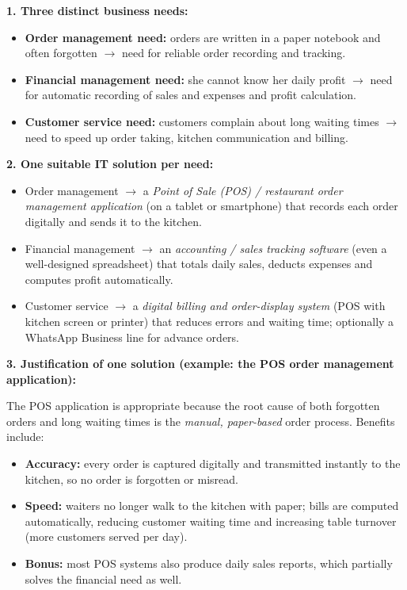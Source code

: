 \documentclass[11pt]{article}
\begin{document}
\begin{corrige}
\textbf{1. Three distinct business needs:}
\begin{itemize}
\item \textbf{Order management need:} orders are written in a paper notebook and often forgotten $\rightarrow$ need for reliable order recording and tracking.
\item \textbf{Financial management need:} she cannot know her daily profit $\rightarrow$ need for automatic recording of sales and expenses and profit calculation.
\item \textbf{Customer service need:} customers complain about long waiting times $\rightarrow$ need to speed up order taking, kitchen communication and billing.
\end{itemize}

\textbf{2. One suitable IT solution per need:}
\begin{itemize}
\item Order management $\rightarrow$ a \emph{Point of Sale (POS) / restaurant order management application} (on a tablet or smartphone) that records each order digitally and sends it to the kitchen.
\item Financial management $\rightarrow$ an \emph{accounting / sales tracking software} (even a well-designed spreadsheet) that totals daily sales, deducts expenses and computes profit automatically.
\item Customer service $\rightarrow$ a \emph{digital billing and order-display system} (POS with kitchen screen or printer) that reduces errors and waiting time; optionally a WhatsApp Business line for advance orders.
\end{itemize}

\textbf{3. Justification of one solution (example: the POS order management application):}

The POS application is appropriate because the root cause of both forgotten orders and long waiting times is the \emph{manual, paper-based} order process. Benefits include:
\begin{itemize}
\item \textbf{Accuracy:} every order is captured digitally and transmitted instantly to the kitchen, so no order is forgotten or misread.
\item \textbf{Speed:} waiters no longer walk to the kitchen with paper; bills are computed automatically, reducing customer waiting time and increasing table turnover (more customers served per day).
\item \textbf{Bonus:} most POS systems also produce daily sales reports, which partially solves the financial need as well.
\end{itemize}
\end{corrige}
\end{document}
